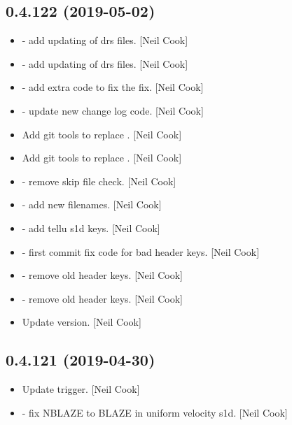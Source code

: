 \documentclass[a4paper,10pt,english]{report}
\begin{document}
\subsection{0.4.122 (2019-05-02)}
\label{\detokenize{misc/changelog:id138}}\begin{itemize}
\item {} 
 - add updating of drs files. {[}Neil Cook{]}

\item {} 
 - add updating of drs files. {[}Neil Cook{]}

\item {} 
 - add extra code to fix the fix. {[}Neil Cook{]}

\item {} 
 - update new change log code. {[}Neil Cook{]}

\item {} 
Add git tools to replace . {[}Neil Cook{]}

\item {} 
Add git tools to replace . {[}Neil Cook{]}

\item {} 
 - remove skip file check. {[}Neil Cook{]}

\item {} 
 - add new filenames. {[}Neil Cook{]}

\item {} 
 - add tellu s1d keys. {[}Neil Cook{]}

\item {} 
 - first commit fix code for bad header keys.
{[}Neil Cook{]}

\item {} 
 - remove old header keys. {[}Neil Cook{]}

\item {} 
 - remove old header keys. {[}Neil Cook{]}

\item {} 
Update version. {[}Neil Cook{]}

\end{itemize}


\subsection{0.4.121 (2019-04-30)}
\label{\detokenize{misc/changelog:id139}}\begin{itemize}
\item {} 
Update trigger. {[}Neil Cook{]}

\item {} 
 - fix NBLAZE to BLAZE in uniform velocity s1d. {[}Neil
Cook{]}

\end{itemize}
\end{document}
